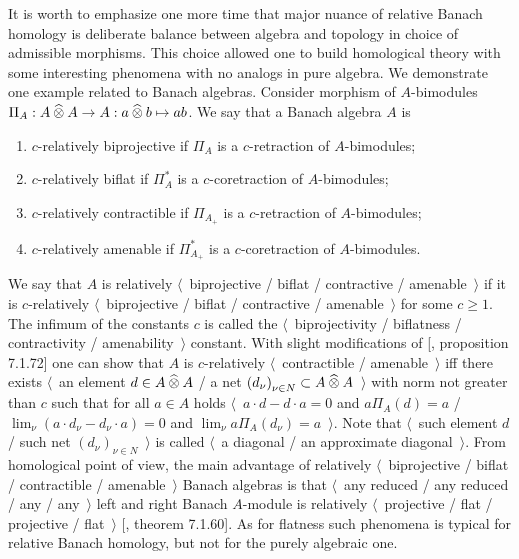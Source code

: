 It is worth to emphasize one more time that major nuance of relative Banach
homology is deliberate balance between algebra and topology in choice of
admissible morphisms. This choice allowed one to build homological theory with
some interesting phenomena with no analogs in pure algebra. We demonstrate one
example related to Banach algebras. Consider morphism of $A$-bimodules
$\Pi_A:A\mathbin{\widehat{\otimes}} A\to A:a\mathbin{\widehat{\otimes}} b\mapsto ab$. We say that a Banach algebra
$A$ is 
\begin{enumerate}[label = (\roman*)]
  \item $c$-relatively biprojective if $\Pi_A$ is a $c$-retraction of
  $A$-bimodules;

  \item $c$-relatively biflat if $\Pi_A^*$ is a $c$-coretraction of 
  $A$-bimodules;

  \item $c$-relatively contractible if $\Pi_{A_+}$ is a $c$-retraction of
  $A$-bimodules;

  \item $c$-relatively amenable if $\Pi_{A_+}^*$ is a $c$-coretraction of
  $A$-bimodules.
\end{enumerate}

We say that $A$ is relatively $\langle$~biprojective / biflat / contractive /
amenable~$\rangle$ if it is $c$-relatively $\langle$~biprojective / biflat /
contractive / amenable~$\rangle$ for some $c\geq 1$. The infimum of the
constants $c$ is called the $\langle$~biprojectivity / biflatness /
contractivity / amenability~$\rangle$ constant.  With slight modifications of
[\cite{HelBanLocConvAlg}, proposition 7.1.72] one can show that $A$ is
$c$-relatively $\langle$~contractible / amenable~$\rangle$ iff there exists
$\langle$~an element $d\in A\mathbin{\widehat{\otimes}} A$ / a net 
${(d_\nu)}_{\nu\in N}\subset A\mathbin{\widehat{\otimes}} A$~$\rangle$ with 
norm not greater than $c$ such that for all $a\in A$ holds 
$\langle$~$a\cdot d-d\cdot a=0$ and $a\Pi_A(d)=a$ / 
$\lim_\nu(a\cdot d_\nu-d_\nu\cdot a)=0$ 
and $\lim_\nu a\Pi_A(d_\nu)=a$~$\rangle$. Note that 
$\langle$~such element $d$ / such net ${(d_\nu)}_{\nu\in N}$~$\rangle$ is called
$\langle$~a diagonal / an approximate diagonal~$\rangle$. From homological point
of view, the main advantage of relatively $\langle$~biprojective / biflat /
contractible / amenable~$\rangle$ Banach algebras is that $\langle$~any reduced
/ any reduced / any / any~$\rangle$ left and right Banach $A$-module is
relatively $\langle$~projective / flat / projective / flat~$\rangle$
[\cite{HelBanLocConvAlg}, theorem 7.1.60]. As for flatness such phenomena is
typical for relative Banach homology, but not for the purely algebraic one.
